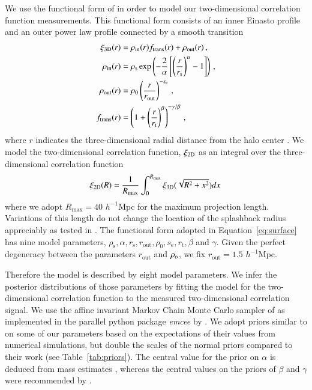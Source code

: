 \documentclass[iop, apjl, twocolappendix, numberedappendix]{emulateapj}
\begin{document}
We use the functional form of \citet{diemer2014dependence} in order
to model our two-dimensional correlation function measurements. This
functional form consists of an inner Einasto profile and an outer
power law profile connected by a smooth transition
\begin{align}
\xi_{\rm 3D}(r) &= \rho_{\mathrm{in}}(r)f_{\mathrm{trans}}(r) + \rho_{\mathrm{out}}(r)\,, \label{eq:model} \\
\rho_{\mathrm{in}}(r)&=\rho_{\mathrm{s}}\exp\left( -\frac{2}{\alpha}\left[ \left( \frac{r}{r_{\mathrm{s}}}\right)^{\alpha}-1 \right] \right)\,,\\
\rho_{\mathrm{out}}(r)&=\rho_{\mathrm{0}}\left( \frac{r}{r_{\mathrm{out}}}\right)^{-s_{\mathrm{e}}} \,,\\
f_{\mathrm{trans}}(r)&=\left( 1+\left( \frac{r}{r_{\mathrm{t}}} \right)^{\beta} \right)^{-\gamma/ \beta}\,,
\label{eq:dk14}
\end{align}
where $r$ indicates the three-dimensional radial distance from the
halo center \citep{diemer2014dependence}. We model the
two-dimensional correlation function, $\xi_{\rm 2D}$ as an integral
over the three-dimensional correlation function
\begin{equation}
\xi_{\rm 2D}(R)=\frac{1}{R_{\rm max}}\int^{R_{\mathrm{max}}}_0 \xi_{\rm 3D}(\sqrt{R^2+x^2}) dx \,
\label{eq:surface}
\end{equation}
where we adopt $R_{\mathrm{max}}=40$ $h^{-1}$Mpc for the maximum projection
length. Variations of this length do not change the location of the
splashback radius appreciably as tested in
\citet{more2016detection}. The functional form adopted in
Equation~\ref{eq:surface} has nine model parameters,
$\rho_{\mathrm{s}}, \alpha, r_{\mathrm{s}}, r_{\mathrm{out}},
\rho_{\mathrm{0}}, s_{\mathrm{e}}, r_{\mathrm{t}}, \beta$ and
$\gamma$. Given the perfect degeneracy between the parameters
$r_{\mathrm{out}}$ and $\rho_{\rm o}$, we fix $r_{\mathrm{out}}=1.5$ $
h^{-1}$Mpc. 

Therefore the model is described by eight model parameters.
We infer the posterior distributions of those parameters by fitting the model for the two-dimensional correlation
function to the measured two-dimensional correlation signal. 
We use the affine invariant Markov Chain Monte Carlo sampler of \citet{goodman2010ensemble} as
implemented in the parallel python package {\it emcee} by
\citet{foreman2013emcee}. We adopt priors similar to
\citet{more2016detection} on some of our parameters based on the
expectations of their values from numerical simulations, but double
the scales of the normal priors compared to their work (see
Table~\ref{tab:priors}). The central value for the prior on $\alpha$
is deduced from mass estimates \citep{gao2008redshift}, whereas the
central values on the priors of $\beta$ and $\gamma$ were
recommended by \citet{diemer2014dependence}.
\end{document}
